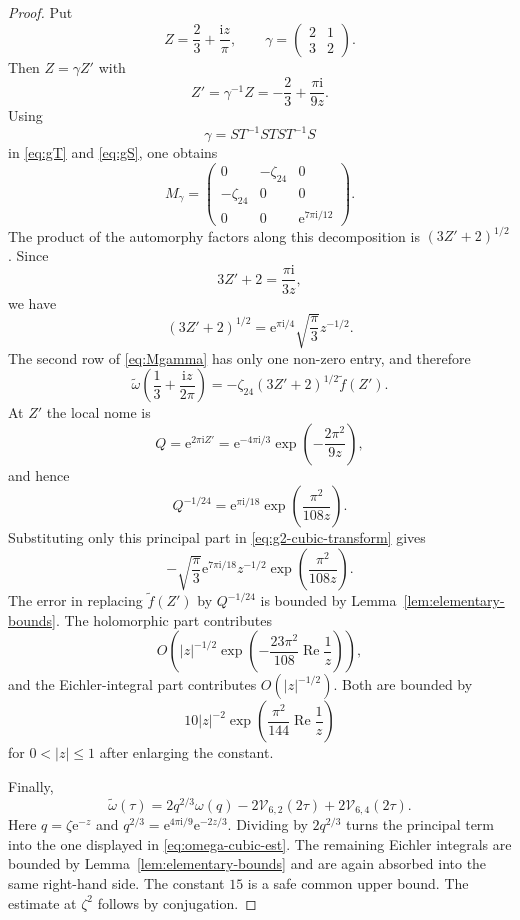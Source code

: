 \documentclass[10pt,a4paper]{amsart}
\newcommand{\ii}{\mathrm i}
\newcommand{\e}{\mathrm e}
\newcommand{\Repart}{\operatorname{Re}}
\begin{document}
\begin{proof}
Put
\[
Z=\frac23+\frac{\ii z}{\pi},
\qquad
\gamma=\begin{pmatrix}2&1\\3&2\end{pmatrix}.
\]
Then $Z=\gamma Z'$ with
\[
Z'=\gamma^{-1}Z=-\frac23+\frac{\pi\ii}{9z}.
\]
Using
\[
\gamma=ST^{-1}STS T^{-1}S
\]
in \eqref{eq:gT} and \eqref{eq:gS}, one obtains
\begin{equation}\label{eq:Mgamma}
M_\gamma=
\begin{pmatrix}
0&-\zeta_{24}&0\\
-\zeta_{24}&0&0\\
0&0&\e^{7\pi\ii/12}
\end{pmatrix}.
\end{equation}
The product of the automorphy factors along this decomposition is
$(3Z'+2)^{1/2}$.  Since
\[
3Z'+2=\frac{\pi\ii}{3z},
\]
we have
\[
(3Z'+2)^{1/2}=\e^{\pi\ii/4}\sqrt{\frac{\pi}{3}}z^{-1/2}.
\]
The second row of \eqref{eq:Mgamma} has only one non-zero entry, and therefore
\begin{equation}\label{eq:g2-cubic-transform}
\widetilde\omega\left(\frac13+\frac{\ii z}{2\pi}\right)
= -\zeta_{24}(3Z'+2)^{1/2}\widetilde f(Z').
\end{equation}
At $Z'$ the local nome is
\[
Q=\e^{2\pi\ii Z'}
=\e^{-4\pi\ii/3}\exp\left(-\frac{2\pi^2}{9z}\right),
\]
and hence
\[
Q^{-1/24}
=
\e^{\pi\ii/18}\exp\left(\frac{\pi^2}{108z}\right).
\]
Substituting only this principal part in \eqref{eq:g2-cubic-transform} gives
\[
-\sqrt{\frac{\pi}{3}}\e^{7\pi\ii/18}z^{-1/2}
\exp\left(\frac{\pi^2}{108z}\right).
\]
The error in replacing $\widetilde f(Z')$ by $Q^{-1/24}$ is bounded by
Lemma~\ref{lem:elementary-bounds}.  The holomorphic part contributes
\[
O\left(|z|^{-1/2}
\exp\left(-\frac{23\pi^2}{108}\Repart\frac1z\right)
\right),
\]
and the Eichler-integral part contributes $O(|z|^{-1/2})$.  Both are bounded by
\[
10 |z|^{-2}\exp\left(\frac{\pi^2}{144}\Repart\frac1z\right)
\]
for $0<|z|\leq1$ after enlarging the constant.

Finally,
\[
\widetilde\omega(\tau)
=2q^{2/3}\omega(q)-2\mathcal V_{6,2}(2\tau)+2\mathcal V_{6,4}(2\tau).
\]
Here $q=\zeta\e^{-z}$ and
$q^{2/3}=\e^{4\pi\ii/9}\e^{-2z/3}$.  Dividing by $2q^{2/3}$ turns the principal
term into the one displayed in \eqref{eq:omega-cubic-est}.  The remaining
Eichler integrals are bounded by Lemma~\ref{lem:elementary-bounds} and are again
absorbed into the same right-hand side.  The constant $15$ is a safe common
upper bound.  The estimate at $\zeta^2$ follows by conjugation.
\end{proof}
\end{document}
